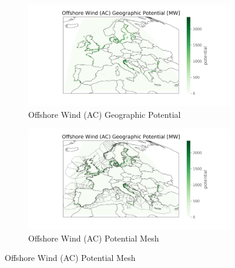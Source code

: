 \begin{figure}[htp]
    \begin{subfigure}{0.45\textwidth}
        \includegraphics[width=\textwidth, trim=3.5cm 0cm 2.5cm 0cm, clip]{Figure/offshore_wind_AC_potential.png}
        \caption{Offshore Wind (AC) Geographic Potential}
    \end{subfigure}
    \hfill
    \begin{subfigure}{0.45\textwidth}
        \includegraphics[width=\textwidth, trim=3.5cm 0cm 2.5cm 0cm, clip]{Figure/offshore_wind_AC_potential_mesh.png}
        \caption{Offshore Wind (AC) Potential Mesh}
    \end{subfigure}
    

\end{figure}

